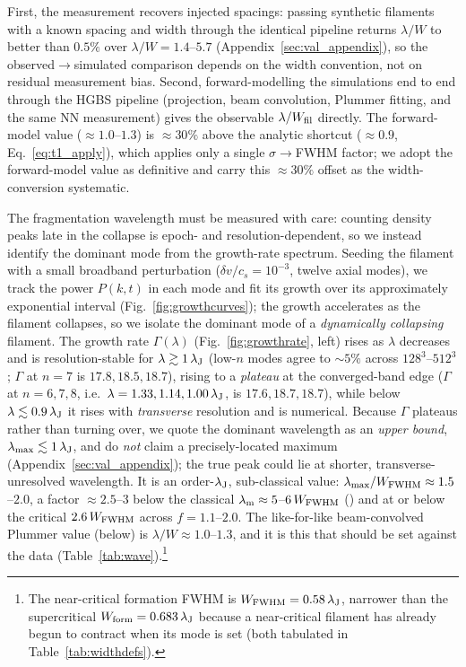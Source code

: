 \documentclass[usenatbib,twoside,twocolumn]{mnras}
\begin{document}
First, the measurement recovers injected spacings: passing synthetic filaments with a known spacing and width through the identical pipeline returns $\lambda/W$ to better than $0.5\%$ over $\lambda/W=1.4$--$5.7$ (Appendix~\ref{sec:val_appendix}), so the observed$\to$simulated comparison depends on the width convention, not on residual measurement bias. Second, forward-modelling the simulations end to end through the HGBS pipeline (projection, beam convolution, Plummer fitting, and the same NN measurement) gives the observable $\lambda/W_{\rm fil}$ directly. The forward-model value ($\approx1.0$--$1.3$) is $\approx30\%$ above the analytic shortcut ($\approx0.9$, Eq.~\ref{eq:t1_apply}), which applies only a single $\sigma\!\to\!$FWHM factor; we adopt the forward-model value as definitive and carry this $\approx30\%$ offset as the width-conversion systematic.

The fragmentation wavelength must be measured with care: counting density peaks late in the collapse is epoch- and resolution-dependent, so we instead identify the dominant mode from the growth-rate spectrum. Seeding the filament with a small broadband perturbation ($\delta v/c_s=10^{-3}$, twelve axial modes), we track the power $P(k,t)$ in each mode and fit its growth over its approximately exponential interval (Fig.~\ref{fig:growthcurves}); the growth accelerates as the filament collapses, so we isolate the dominant mode of a \emph{dynamically collapsing} filament. The growth rate $\Gamma(\lambda)$ (Fig.~\ref{fig:growthrate}, left) rises as $\lambda$ decreases and is resolution-stable for $\lambda\gtrsim1\,\lambda_{\rm J}$ (low-$n$ modes agree to $\sim5\%$ across $128^3$--$512^3$; $\Gamma$ at $n=7$ is $17.8,18.5,18.7$), rising to a \emph{plateau} at the converged-band edge ($\Gamma$ at $n=6,7,8$, i.e.\ $\lambda=1.33,1.14,1.00\,\lambda_{\rm J}$, is $17.6,18.7,18.7$), while below $\lambda\lesssim0.9\,\lambda_{\rm J}$ it rises with \emph{transverse} resolution and is numerical. Because $\Gamma$ plateaus rather than turning over, we quote the dominant wavelength as an \emph{upper bound}, $\lambda_{\rm max}\lesssim1\,\lambda_{\rm J}$, and do \emph{not} claim a precisely-located maximum (Appendix~\ref{sec:val_appendix}); the true peak could lie at shorter, transverse-unresolved wavelength. It is an order-$\lambda_{\rm J}$, sub-classical value: $\lambda_{\rm max}/W_{\rm FWHM}\approx1.5$--$2.0$, a factor $\approx2.5$--$3$ below the classical $\lambda_{\rm m}\approx5$--$6\,W_{\rm FWHM}$ (\citealt{Fischera2012}) and at or below the critical $2.6\,W_{\rm FWHM}$ across $f=1.1$--$2.0$. The like-for-like beam-convolved Plummer value (below) is $\lambda/W\approx1.0$--$1.3$, and it is this that should be set against the data (Table~\ref{tab:wave}).\footnote{The near-critical formation FWHM is $W_{\rm FWHM}=0.58\,\lambda_{\rm J}$, narrower than the supercritical $W_{\rm form}=0.683\,\lambda_{\rm J}$ because a near-critical filament has already begun to contract when its mode is set (both tabulated in Table~\ref{tab:widthdefs}).}
\end{document}
